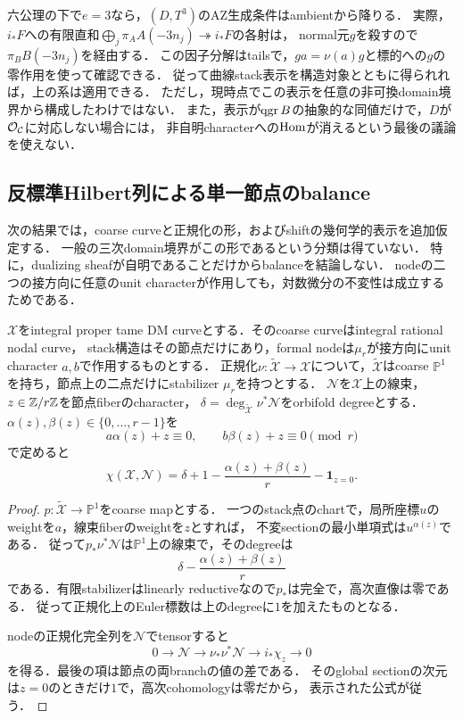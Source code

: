 \documentclass[11pt,a4paper]{ltjsarticle}
\begin{document}
\begin{remark}[三次境界への適用条件]
六公理の下で$e=3$なら，$(D,T^3)$のAZ生成条件はambientから降りる．
実際，$i_*F$への有限直和$\bigoplus_j\pi_AA(-3n_j)\twoheadrightarrow i_*F$の各射は，
normal元$g$を殺すので$\pi_BB(-3n_j)$を経由する．
この因子分解はtailsで，$ga=\nu(a)g$と標的への$g$の零作用を使って確認できる．
従って曲線stack表示を構造対象とともに得られれば，上の系は適用できる．
ただし，現時点でこの表示を任意の非可換domain境界から構成したわけではない．
また，表示が$\operatorname{qgr} B$の抽象的な同値だけで，$D$が$\mathcal O_{\mathcal C}$に対応しない場合には，
非自明characterへの$\operatorname{Hom}$が消えるという最後の議論を使えない．
\end{remark}
\subsection{反標準Hilbert列による単一節点のbalance}

次の結果では，coarse curveと正規化の形，およびshiftの幾何学的表示を追加仮定する．
一般の三次domain境界がこの形であるという分類は得ていない．
特に，dualizing sheafが自明であることだけからbalanceを結論しない．
nodeの二つの接方向に任意のunit characterが作用しても，対数微分の不変性は成立するためである．

\begin{lemma}\label{lem:orbinode-riemann-roch}
$\mathcal X$をintegral proper tame DM curveとする．そのcoarse curveはintegral rational nodal curve，
stack構造はその節点だけにあり，formal nodeは$\mu_r$が接方向にunit character $a,b$で作用するものとする．
正規化$\nu:\widetilde{\mathcal X}\to\mathcal X$について，$\widetilde{\mathcal X}$はcoarse $\mathbb P^1$を持ち，節点上の二点だけにstabilizer $\mu_r$を持つとする．
$\mathcal N$を$\mathcal X$上の線束，$z\in\mathbb Z/r\mathbb Z$を節点fiberのcharacter，
$\delta=\deg_{\widetilde{\mathcal X}}\nu^*\mathcal N$をorbifold degreeとする．
$\alpha(z),\beta(z)\in\{0,\ldots,r-1\}$を
\[
 a\alpha(z)+z\equiv0,\qquad b\beta(z)+z\equiv0\pmod r
\]
で定めると
\begin{equation}\label{eq:v6-orbinode-RR}
 \chi(\mathcal X,\mathcal N)
 =\delta+1-\frac{\alpha(z)+\beta(z)}r-\mathbf1_{z=0}.
\end{equation}
\end{lemma}

\begin{proof}
$p:\widetilde{\mathcal X}\to\mathbb P^1$をcoarse mapとする．
一つのstack点のchartで，局所座標$u$のweightを$a$，線束fiberのweightを$z$とすれば，
不変sectionの最小単項式は$u^{\alpha(z)}$である．
従って$p_*\nu^*\mathcal N$は$\mathbb P^1$上の線束で，そのdegreeは
\[
 \delta-\frac{\alpha(z)+\beta(z)}r
\]
である．有限stabilizerはlinearly reductiveなので$p_*$は完全で，高次直像は零である．
従って正規化上のEuler標数は上のdegreeに$1$を加えたものとなる．

nodeの正規化完全列を$\mathcal N$でtensorすると
\[
 0\longrightarrow\mathcal N\longrightarrow\nu_*\nu^*\mathcal N
 \longrightarrow i_*\chi_z\longrightarrow0
\]
を得る．最後の項は節点の両branchの値の差である．
そのglobal sectionの次元は$z=0$のときだけ$1$で，高次cohomologyは零だから，
表示された公式が従う．
\end{proof}
\end{document}
